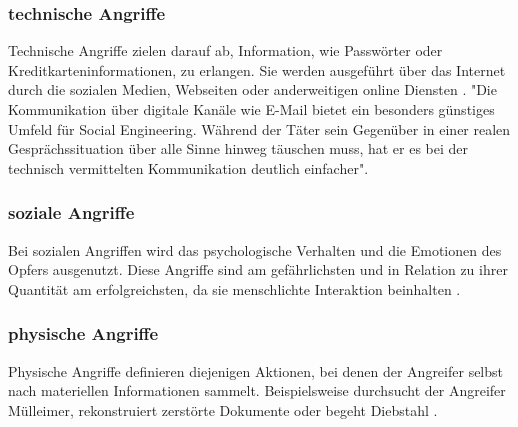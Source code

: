 \subsubsection{technische Angriffe}

Technische Angriffe zielen darauf ab, Information, wie Passwörter oder Kreditkarteninformationen, zu erlangen. Sie werden ausgeführt über das Internet durch die sozialen Medien,
Webseiten oder anderweitigen online Diensten . "Die Kommunikation über digitale Kanäle wie E-Mail bietet ein besonders günstiges Umfeld für Social Engineering.
Während der Täter sein Gegenüber in einer realen Gesprächssituation über alle Sinne hinweg täuschen muss, hat er
es bei der technisch vermittelten Kommunikation deutlich einfacher".

\subsubsection{soziale Angriffe}

Bei sozialen Angriffen wird das psychologische Verhalten und die Emotionen des Opfers ausgenutzt. Diese Angriffe sind am gefährlichsten und in Relation zu ihrer Quantität am
erfolgreichsten, da sie menschlichte Interaktion beinhalten .

\subsubsection{physische Angriffe}

Physische Angriffe definieren diejenigen Aktionen, bei denen der Angreifer selbst nach materiellen Informationen sammelt. Beispielsweise durchsucht der Angreifer Mülleimer,
rekonstruiert zerstörte Dokumente oder begeht Diebstahl .






